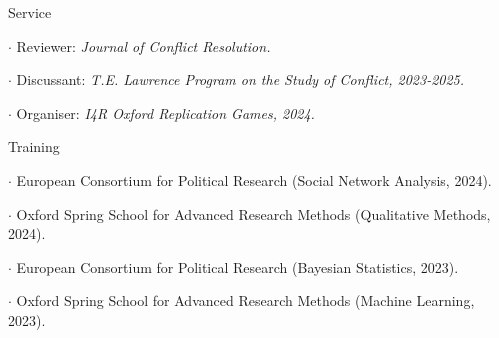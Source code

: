 \documentclass[10pt]{resume} %
\begin{document}
	\begin{rSection}{Service} \itemsep -5pt
		\item $\cdot$ Reviewer: \textit{Journal of Conflict Resolution.}
		\item $\cdot$ Discussant: \textit{T.E. Lawrence Program on the Study of Conflict, 2023-2025.}
		\item $\cdot$ Organiser: \textit{I4R Oxford Replication Games, 2024.}
	\end{rSection}

	\begin{rSection}{Training} \itemsep -5pt
		
		\item $\cdot$ European Consortium for Political Research (Social Network Analysis, 2024).
    
  		\item $\cdot$ Oxford Spring School for Advanced Research Methods (Qualitative Methods, 2024).
		
		\item $\cdot$ European Consortium for Political Research (Bayesian Statistics, 2023).
		
		\item $\cdot$ Oxford Spring School for Advanced Research Methods (Machine Learning, 2023).
	
	\end{rSection}
\end{document}
